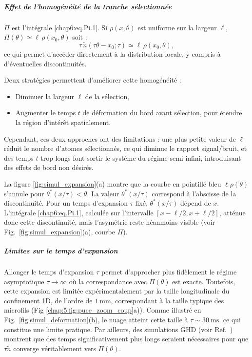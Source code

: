 \subparagraph{Effet de l’homogénéité de la tranche sélectionnée}

$\Pi$ est l'intégrale \eqref{chap6:eq.Pi.1}. Si $\rho(x,\theta)$ est uniforme sur la largeur $\ell$, $\Pi(\theta) \simeq \ell\, \rho(x_0,\theta) $ soit :
\begin{equation}
 \tau\, \tilde{n}(\tau \theta - x_0 ; \tau) \simeq \ell\, \rho(x_0,\theta),
\end{equation}
ce qui permet d’accéder directement à la distribution locale, y compris à d’éventuelles discontinuités.

\medskip

Deux stratégies permettent d’améliorer cette homogénéité :
\begin{itemize}[label = $\bullet$] 
    \item Diminuer la largeur $\ell$ de la sélection,
    \item Augmenter le temps $t$ de déformation du bord avant sélection, pour étendre la région d’intérêt spatialement.
\end{itemize}
Cependant, ces deux approches ont des limitations : une plus petite valeur de $\ell$ réduit le nombre d’atomes sélectionnés, ce qui diminue le rapport signal/bruit, et des temps $t$ trop longs font sortir le système du régime semi-infini, introduisant des effets de bord non désirés.

\medskip

La figure \ref{fig:simul_expansion}(a) montre que la courbe en pointillé bleu $\ell \rho (\theta)$ s’annule pour $ \theta^\ast(x/\tau) < \theta $. La valeur $\theta^\ast(x/\tau)$ correspond à l’abscisse de la discontinuité. Pour un temps d’expansion $\tau$ fixé, $\theta^\ast(x/\tau)$ dépend de $x$. L’intégrale \eqref{chap6:eq.Pi.1}, calculée sur l’intervalle $[x - \ell/2, x + \ell/2]$, atténue donc cette discontinuité, mais l’asymétrie reste néanmoins visible (voir Fig.~\ref{fig:simul_expansion}(a), courbe $\Pi$).

\subparagraph{Limites sur le temps d’expansion}

Allonger le temps d’expansion $\tau$ permet d’approcher plus fidèlement le régime asymptotique $\tau \to \infty$ où la correspondance avec $\Pi(\theta)$ est exacte. Toutefois, cette expansion est limitée expérimentalement par la taille longitudinale du confinement 1D, de l’ordre de $1~\mathrm{mm}$, correspondant à la taille typique des  microfils (Fig \ref{chap:5:fig:puce_zoom_coup}a)). Comme illustré en Fig.~\ref{fig:simul_deformation}(b), le nuage atteint cette taille à $\tau \sim 30~\mathrm{ms}$, ce qui constitue une limite pratique. Par ailleurs, des simulations GHD (voir Ref.~\cite{PhysRevLett.133.113402}) montrent que des temps significativement plus longs seraient nécessaires pour que $\tau \tilde{n}$ converge véritablement vers $\Pi(\theta)$.

